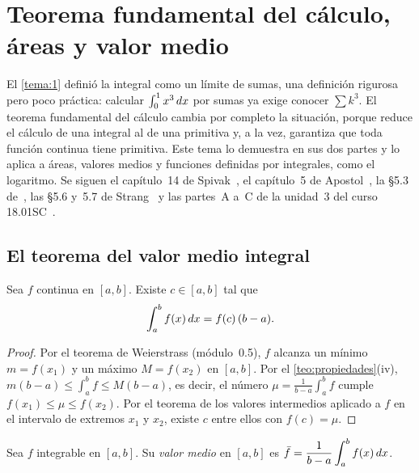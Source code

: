 \chapter{Teorema fundamental del cálculo, áreas y valor medio}
\label{tema:2}

El \cref{tema:1} definió la integral como un límite de sumas, una definición rigurosa pero poco práctica: calcular $\int_0^1x^{3}\mathop{}\!d x$ por sumas ya exige conocer $\sum k^{3}$. El teorema fundamental del cálculo cambia por completo la situación, porque reduce el cálculo de una integral al de una primitiva y, a la vez, garantiza que toda función continua tiene primitiva. Este tema lo demuestra en sus dos partes y lo aplica a áreas, valores medios y funciones definidas por integrales, como el logaritmo. Se siguen el capítulo~14 de Spivak~\cite{spivak}, el capítulo~5 de Apostol~\cite{apostol}, la §5.3 de~\cite{openstax1}, las §5.6 y~5.7 de Strang~\cite{strang} y las partes~A a~C de la unidad~3 del curso 18.01SC~\cite{mit1801}.

\section{El teorema del valor medio integral}

\begin{teorema}\label{teo:tvm-integral}
Sea $f$ continua en $[a,b]$. Existe $c\in[a,b]$ tal que
\[
\int_a^b f(x)\mathop{}\!d x=f(c)\,(b-a).
\]
\end{teorema}

\begin{proof}
Por el teorema de Weierstrass (módulo~0.5), $f$ alcanza un mínimo $m=f(x_1)$ y un máximo $M=f(x_2)$ en $[a,b]$. Por el \cref{teo:propiedades}(iv), $m(b-a)\le\int_a^b f\le M(b-a)$, es decir, el número $\mu=\frac{1}{b-a}\int_a^b f$ cumple $f(x_1)\le\mu\le f(x_2)$. Por el teorema de los valores intermedios aplicado a $f$ en el intervalo de extremos $x_1$ y $x_2$, existe $c$ entre ellos con $f(c)=\mu$.
\end{proof}

\begin{definicion}\label{def:valor-medio}
Sea $f$ integrable en $[a,b]$. Su \emph{valor medio} en $[a,b]$ es
$\displaystyle\bar f=\frac{1}{b-a}\int_a^b f(x)\mathop{}\!d x$.
\end{definicion}

